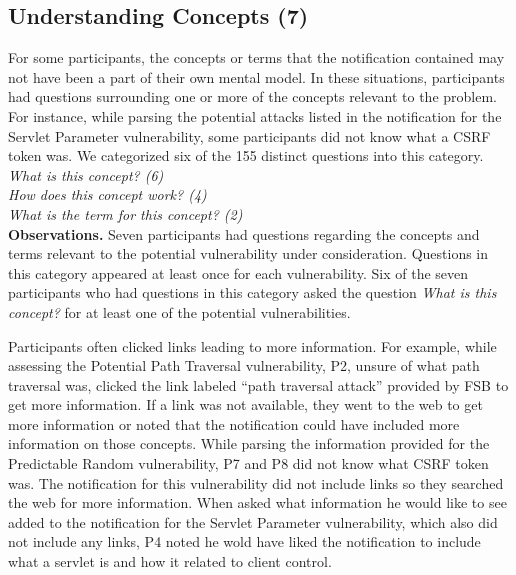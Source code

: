 \documentclass[conference]{IEEEtran}
\begin{document}

\noindent\subsection{\textbf{Understanding Concepts (7)}}\label{uc}

For some participants, the concepts or terms that the notification contained may not have been a part of their own mental model. 
In these situations, participants had questions surrounding one or more of the concepts relevant to the problem.
For instance, while parsing the potential attacks listed in the notification for the Servlet Parameter vulnerability, some participants did not know what a CSRF token was.
We categorized six of the 155 distinct questions into this category. 
\\

\noindent\emph{What is this concept? (6)} \\
\emph{How does this concept work? (4)} \\
\emph{What is the term for this concept? (2)} \\


\noindent\textbf{Observations.}
Seven participants had questions regarding the concepts and terms relevant to the potential vulnerability under consideration. 
Questions in this category appeared at least once for each vulnerability.
Six of the seven participants who had questions in this category asked the question \textit{What is this concept?} for at least one of the potential vulnerabilities.


Participants often clicked links leading to more information.
For example, while assessing the Potential Path Traversal vulnerability, P2, unsure of what path traversal was, clicked the link labeled ``path traversal attack'' provided by FSB to get more information.
If a link was not available, they went to the web to get more information or noted that the notification could have included more information on those concepts.
While parsing the information provided for the Predictable Random vulnerability, P7 and P8 did not know what CSRF token was.
The notification for this vulnerability did not include links so they searched the web for more information. 
When asked what information he would like to see added to the notification for the Servlet Parameter vulnerability, which also did not include any links, P4 noted he wold have liked the notification to include what a servlet is and how it related to client control.
\\
\end{document}
